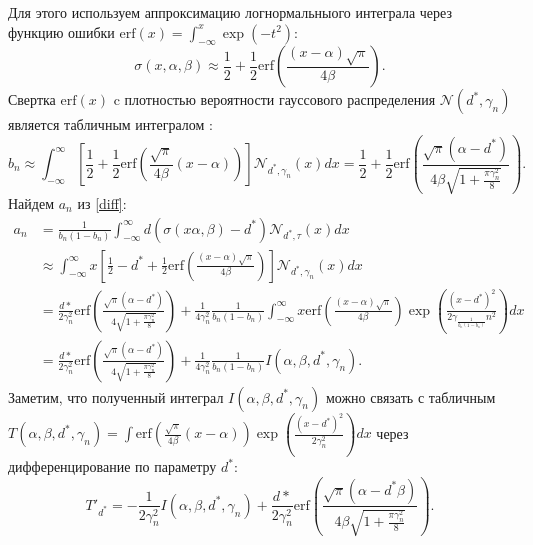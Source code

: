 Для этого используем аппроксимацию логнормальныого интеграла через функцию ошибки $\text{erf}(x) = \int_{-\infty}^x \exp(-t^2)$:
\begin{equation}
     \sigma(x, \alpha, \beta) \approx \frac{1}{2} + \frac{1}{2} \text{erf}\left(\frac{(x-\alpha)\sqrt{\pi}}{4 \beta}\right).   
\end{equation}
Свертка  $\text{erf}(x)$ c плотностью вероятности гауссового распределения $\mathcal{N}(d^*,\gamma_n)$ является табличным интегралом \cite{ng1969table}:
\begin{equation}
    b_n \approx \int_{-\infty}^{\infty} \left[\frac{1}{2} + \frac{1}{2} \text{erf}\left(\frac{\sqrt{\pi}}{4\beta} (x-\alpha) \right) \right] \mathcal{N}_{d^*,\gamma_n}(x) dx = 
    \frac{1}{2} + \frac{1}{2} \text{erf}\left(\frac{\sqrt{\pi} (\alpha-d^*)}{4 \beta \sqrt{1+\frac{\pi\gamma_n^2}{8}}} \right).
\end{equation}
Найдем $a_n$ из \ref{diff}:
\begin{equation}
    \label{a_n}
    \begin{aligned}
          a_n &= \frac{1}{b_n(1-b_n)} \int_{-\infty}^{\infty} d (\sigma(x\alpha,\beta) -d^*) \mathcal{N}_{d^*,\tau}(x)  dx \\  
          &\approx  \int_{-\infty}^{\infty} x \left[\frac{1}{2} - d^* + \frac{1}{2} \text{erf}\left(\frac{(x-\alpha)\sqrt{\pi}}{4 \beta}\right)\right] \mathcal{N}_{d^*,\gamma_n}(x) dx \\
          &= \frac{d*}{2 \gamma_n^2} \text{erf}\left(\frac{\sqrt{\pi} (\alpha-d^*)}{4 \sqrt{1+\frac{\pi\gamma_n^2}{8}}} \right)  + \frac{1}{4 \gamma_n^2} \frac{1}{b_n(1-b_n)} \int_{-\infty}^{\infty} x \text{erf}\left(\frac{(x-\alpha)\sqrt{\pi}}{4 \beta}\right) \exp\left(\frac{(x-d^*)^2}{2 \gamma_\frac{1}{b_n(1-b_n)}n^2}\right) dx \\
          & = \frac{d*}{2 \gamma_n^2} \text{erf}\left(\frac{\sqrt{\pi} (\alpha-d^*)}{4 \sqrt{1+\frac{\pi\gamma_n^2}{8}}} \right) + \frac{1}{4 \gamma_n^2} \frac{1}{b_n(1-b_n)} I(\alpha,\beta,d^*,\gamma_n).
    \end{aligned}
\end{equation}
Заметим, что полученный интеграл $I(\alpha,\beta,d^*,\gamma_n)$ можно связать с табличным  
$T(\alpha,\beta,d^*,\gamma_n) = \int\text{erf}\left(\frac{\sqrt{\pi}}{4\beta} (x-\alpha) \right) \exp\left(\frac{(x-d^*)^2}{2 \gamma_n^2}\right) dx$ через дифференцирование по параметру $d^*$: 
\begin{equation}
    \label{left}
    T'_{d^*} = - \frac{1}{2\gamma_n^2}I(\alpha,\beta,d^*,\gamma_n) + \frac{d*}{2 \gamma_n^2} \text{erf}\left(\frac{\sqrt{\pi} (\alpha-d^* \beta )}{4 \beta \sqrt{1+\frac{\pi\gamma_n^2}{8}}} \right) .
\end{equation}
